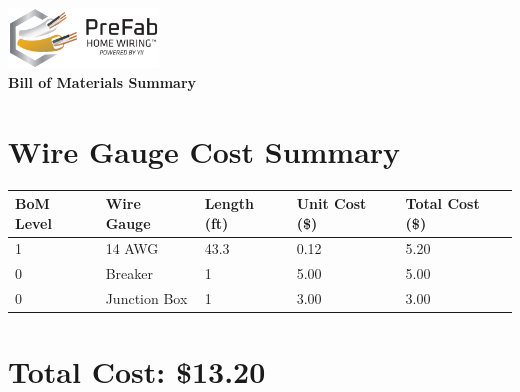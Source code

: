 \documentclass{article}
\begin{document}
\begin{center}
\includegraphics[width=0.3\textwidth]{logo.png}\\[1em]
{\LARGE \textbf{Bill of Materials Summary}}\\[0.5em]
\end{center}
\vspace{1.5em}
\section*{Wire Gauge Cost Summary}
\begin{tabular}{lllll}
\toprule
\textbf{BoM Level} & \textbf{Wire Gauge} & \textbf{Length (ft)} & \textbf{Unit Cost (\$)} & \textbf{Total Cost (\$)} \\
\midrule
1 & 14 AWG & 43.3 & 0.12 & 5.20 \\
\midrule
0 & Breaker & 1 & 5.00 & 5.00 \\
0 & Junction Box & 1 & 3.00 & 3.00 \\
\bottomrule
\end{tabular}

\section*{Total Cost: \$13.20}
\end{document}
